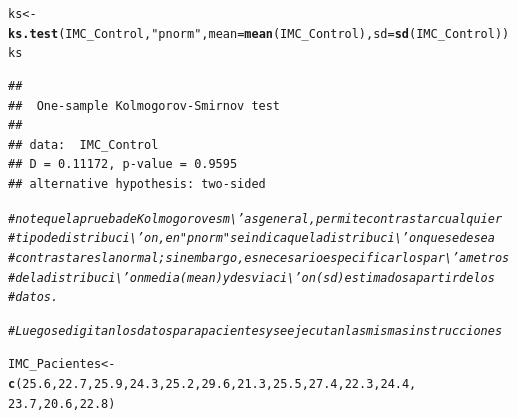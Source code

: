 \documentclass[12pt,letterpaper]{article}\usepackage[]{graphicx}\usepackage[]{color}
\makeatletter
\newcommand{\hlnum}[1]{\textcolor[rgb]{0.686,0.059,0.569}{#1}}%
\newcommand{\hlstr}[1]{\textcolor[rgb]{0.192,0.494,0.8}{#1}}%
\newcommand{\hlcom}[1]{\textcolor[rgb]{0.678,0.584,0.686}{\textit{#1}}}%
\newcommand{\hlstd}[1]{\textcolor[rgb]{0.345,0.345,0.345}{#1}}%
\newcommand{\hlkwb}[1]{\textcolor[rgb]{0.69,0.353,0.396}{#1}}%
\newcommand{\hlkwc}[1]{\textcolor[rgb]{0.333,0.667,0.333}{#1}}%
\newcommand{\hlkwd}[1]{\textcolor[rgb]{0.737,0.353,0.396}{\textbf{#1}}}%
\newenvironment{kframe}{%
 \def\at@end@of@kframe{}%
 \ifinner\ifhmode%
  \def\at@end@of@kframe{\end{minipage}}%
  \begin{minipage}{\columnwidth}%
 \fi\fi%
 \def\FrameCommand##1{\hskip\@totalleftmargin \hskip-\fboxsep
 \colorbox{shadecolor}{##1}\hskip-\fboxsep
     \hskip-\linewidth \hskip-\@totalleftmargin \hskip\columnwidth}%
 \MakeFramed {\advance\hsize-\width
   \@totalleftmargin\z@ \linewidth\hsize
   \@setminipage}}%
 {\par\unskip\endMakeFramed%
 \at@end@of@kframe}
\newenvironment{knitrout}{}{} %
\makeatother
\begin{document}
\begin{knitrout}
\begin{kframe}
\begin{alltt}
\hlstd{ks} \hlkwb{<-} \hlkwd{ks.test}\hlstd{(IMC_Control,}\hlstr{"pnorm"}\hlstd{,}\hlkwc{mean}\hlstd{=}\hlkwd{mean}\hlstd{(IMC_Control),}\hlkwc{sd}\hlstd{=}\hlkwd{sd}\hlstd{(IMC_Control))}
\hlstd{ks}
\end{alltt}
\begin{verbatim}
## 
## 	One-sample Kolmogorov-Smirnov test
## 
## data:  IMC_Control
## D = 0.11172, p-value = 0.9595
## alternative hypothesis: two-sided
\end{verbatim}
\begin{alltt}
\hlcom{# note que la prueba de Kolmogorov es m\textbackslash{}'as general, permite contrastar cualquier }
\hlcom{# tipo de distribuci\textbackslash{}'on, en "pnorm" se indicaque la distribuci\textbackslash{}'on que se desea }
\hlcom{# contrastar es la normal; sin embargo, es necesario especificar los par\textbackslash{}'ametros }
\hlcom{# de la distribuci\textbackslash{}'on media (mean) y desviaci\textbackslash{}'on (sd) estimados a partir de los }
\hlcom{# datos.}

\hlcom{# Luego se digitan los datos para pacientes y se ejecutan las mismas instrucciones }

\hlstd{IMC_Pacientes} \hlkwb{<-} \hlkwd{c}\hlstd{(}\hlnum{25.6}\hlstd{,} \hlnum{22.7}\hlstd{,} \hlnum{25.9}\hlstd{,} \hlnum{24.3}\hlstd{,} \hlnum{25.2}\hlstd{,} \hlnum{29.6}\hlstd{,} \hlnum{21.3}\hlstd{,} \hlnum{25.5}\hlstd{,} \hlnum{27.4}\hlstd{,} \hlnum{22.3}\hlstd{,} \hlnum{24.4}\hlstd{,}
                   \hlnum{23.7}\hlstd{,} \hlnum{20.6}\hlstd{,} \hlnum{22.8}\hlstd{)}
\end{alltt}
\end{kframe}
\end{knitrout}
\end{document}
